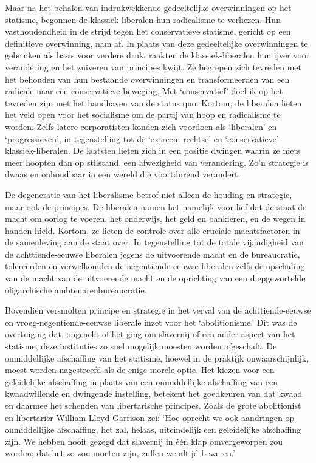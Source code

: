 \documentclass[
  a5paper,
  smalldemyvopaper,10pt,twoside,onecolumn,openright,extrafontsizes,hidelinks]{memoir}
\begin{document}
Maar na het behalen van indrukwekkende gedeeltelijke overwinningen op
het statisme, begonnen de klassiek-liberalen hun radicalisme te
verliezen. Hun vasthoudendheid in de strijd tegen het conservatieve
statisme, gericht op een definitieve overwinning, nam af. In plaats van
deze gedeeltelijke overwinningen te gebruiken als basis voor verdere
druk, raakten de klassiek-liberalen hun ijver voor verandering en het
zuiveren van principes kwijt. Ze begrepen zich tevreden met het behouden
van hun bestaande overwinningen en transformeerden van een radicale naar
een conservatieve beweging. Met `conservatief' doel ik op het tevreden
zijn met het handhaven van de status quo. Kortom, de liberalen lieten
het veld open voor het socialisme om de partij van hoop en radicalisme
te worden. Zelfs latere corporatisten konden zich voordoen als
`liberalen' en `progressieven', in tegenstelling tot de `extreem
rechtse' en `conservatieve' klassiek-liberalen. De laatsten lieten zich
in een positie dwingen waarin ze niets meer hoopten dan op stilstand,
een afwezigheid van verandering. Zo'n strategie is dwaas en onhoudbaar
in een wereld die voortdurend verandert.

De degeneratie van het liberalisme betrof niet alleen de houding en
strategie, maar ook de principes. De liberalen namen het namelijk voor
lief dat de staat de macht om oorlog te voeren, het onderwijs, het geld
en bankieren, en de wegen in handen hield. Kortom, ze lieten de controle
over alle cruciale machtsfactoren in de samenleving aan de staat over.
In tegenstelling tot de totale vijandigheid van de achttiende-eeuwse
liberalen jegens de uitvoerende macht en de bureaucratie, tolereerden en
verwelkomden de negentiende-eeuwse liberalen zelfs de opschaling van de
macht van de uitvoerende macht en de oprichting van een diepgewortelde
oligarchische ambtenarenbureaucratie.

Bovendien versmolten principe en strategie in het verval van de
achttiende-eeuwse en vroeg-negentiende-eeuwse liberale inzet voor het
`abolitionisme.' Dit was de overtuiging dat, ongeacht of het ging om
slavernij of een ander aspect van het statisme, deze instituties zo snel
mogelijk moesten worden afgeschaft. De onmiddellijke afschaffing van het
statisme, hoewel in de praktijk onwaarschijnlijk, moest worden
nagestreefd als de enige morele optie. Het kiezen voor een geleidelijke
afschaffing in plaats van een onmiddellijke afschaffing van een
kwaadwillende en dwingende instelling, betekent het goedkeuren van dat
kwaad en daarmee het schenden van libertarische principes. Zoals de
grote abolitionist en libertariër William Lloyd Garrison zei: `Hoe
oprecht we ook aandringen op onmiddellijke afschaffing, het zal, helaas,
uiteindelijk een geleidelijke afschaffing zijn. We hebben nooit gezegd
dat slavernij in één klap omvergeworpen zou worden; dat het zo zou
moeten zijn, zullen we altijd beweren.'
\end{document}
